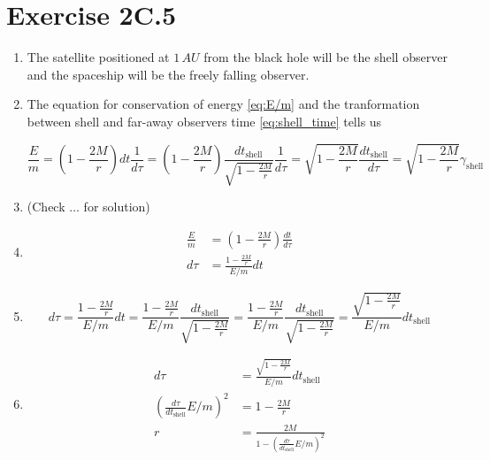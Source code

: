 \documentclass[a4paper,10pt,english]{article}
\begin{document}
\section*{Exercise 2C.5}

\begin{enumerate}

\item The satellite positioned at $1\,AU$ from the black hole will be the shell observer and the  spaceship will be the freely falling observer.

\item The equation for conservation of energy \ref{eq:E/m} and the tranformation between shell and far-away observers time \ref{eq:shell_time} tells us 

\begin{equation*}
\frac{E}{m}=\left(1-\frac{2M}{r}\right)dt\frac{1}{d\tau}=\left(1-\frac{2M}{r}\right)\frac{dt_{\text{shell}}}{\sqrt{1-\frac{2M}{r}}}\frac{1}{d\tau}={\sqrt{1-\frac{2M}{r}}}\frac{dt_{\text{shell}}}{d\tau}={\sqrt{1-\frac{2M}{r}}}\gamma_{\text{shell}}
\end{equation*}


\item (Check $\ldots$ for solution)

\item 

\begin{align*}
\frac{E}{m}&=\left(1-\frac{2M}{r}\right)\frac{dt}{d\tau}\\
d\tau&=\frac{1-\frac{2M}{r}}{E/m}dt
\end{align*}

\item 

\begin{equation*}
d\tau=\frac{1-\frac{2M}{r}}{E/m}dt=\frac{1-\frac{2M}{r}}{E/m}\frac{dt_{\text{shell}}}{\sqrt{1-\frac{2M}{r}}}=\frac{1-\frac{2M}{r}}{E/m}\frac{dt_{\text{shell}}}{\sqrt{1-\frac{2M}{r}}}=\frac{\sqrt{1-\frac{2M}{r}}}{E/m}dt_{\text{shell}}
\end{equation*}

\item 

\begin{align*}
d\tau&=\frac{\sqrt{1-\frac{2M}{r}}}{E/m}dt_{\text{shell}}\\
\left(\frac{d\tau}{dt_{\text{shell}}}E/m\right)^{2}&=1-\frac{2M}{r}\\
r&=\frac{2M}{1-\left(\frac{d\tau}{dt_{\text{shell}}}E/m\right)^{2}}
\end{align*}


\end{enumerate}
\end{document}
